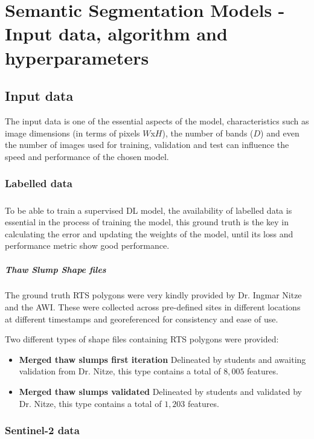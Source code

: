 \chapter{Semantic Segmentation Models - Input data, algorithm and hyperparameters} \label{input_data_section}
\section{Input data} \label{input_data_sec}
The input data is one of the essential aspects of the model, characteristics such as image dimensions (in terms of pixels $W$x$H$), the number of bands ($D$) and even the number of images used for training, validation and test can influence the speed and performance of the chosen model.
\subsection{Labelled data} \label{labeled_data}
\paragraph{}
To be able to train a supervised \gls{DL} model, the availability of labelled data is essential in the process of training the model, this ground truth is the key in calculating the error and updating the weights of the model, until its loss and performance metric show good performance.
\paragraph{Thaw Slump Shape files}
The ground truth \gls{RTS} polygons were very kindly provided by Dr. Ingmar Nitze and the \gls{AWI}. These were collected across pre-defined sites in different locations at different timestamps and georeferenced for consistency and ease of use.

Two different types of shape files containing \gls{RTS} polygons were provided:
\begin{itemize}
    \item \textbf{Merged thaw slumps first iteration} Delineated by students and awaiting validation from Dr. Nitze, this type contains a total of $8,005$ features.
    \item \textbf{Merged thaw slumps validated} Delineated by students and validated by Dr. Nitze, this type contains a total of $1,203$ features.
\end{itemize}
\subsection{Sentinel-2 data} \label{sentinel2_section}

